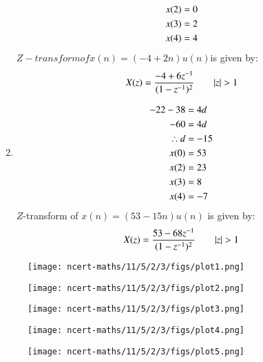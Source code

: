 \documentclass[journal,12pt,twocolumn]{IEEEtran}
\theoremstyle{remark}
\begin{document}
\begin{center}
\begin{enumerate}
\begin{align}
          x(2)&=0\\
          x(3)&=2 \\
          x(4)&=4 \notag\\
    \end{align}
    $Z-transform of x(n) = (-4 + 2n)u(n) $is given by:
    \begin{align}
       &X(z)=\frac{-4+6{z^{-1}}}{(1-{z^{-1}})^2} \qquad  |z|>1  \notag\\
    \end{align}
       \item    
     \begin{align}
         -22-38&=4d\\
          -60&=4d\\
           \therefore d&=-15\\
            x(0)&=53\\
            x(2)&=23\\
            x(3)&=8\\
            x(4)&=-7 \notag\\
     \end{align}
     $Z$-transform of $x(n) = (53 - 15n)u(n)$ is given by:
\begin{align}
       &X(z)=\frac{53-68{z^{-1}}}{(1-{z^{-1}})^2}\qquad|z|>1 \notag \\
\end{align}
\end{enumerate}             
          
\end{center}

\begin{figure}[h]
       \centering
        \texttt{[image: ncert-maths/11/5/2/3/figs/plot1.png]} %
        \caption{}
\end{figure}

\begin{figure}[h]
      \centering
       \texttt{[image: ncert-maths/11/5/2/3/figs/plot2.png]} %
        \caption{}
    \end{figure}
    
\begin{figure}[h]
      \centering
       \texttt{[image: ncert-maths/11/5/2/3/figs/plot3.png]} %
        \caption{}
    \end{figure}
    
\begin{figure}[h] 
      \centering
       \texttt{[image: ncert-maths/11/5/2/3/figs/plot4.png]} %
        \caption{}
    \end{figure}
    
\begin{figure}[h]
      \centering
       \texttt{[image: ncert-maths/11/5/2/3/figs/plot5.png]} %
        \caption{}
\end{figure}
\end{document}
